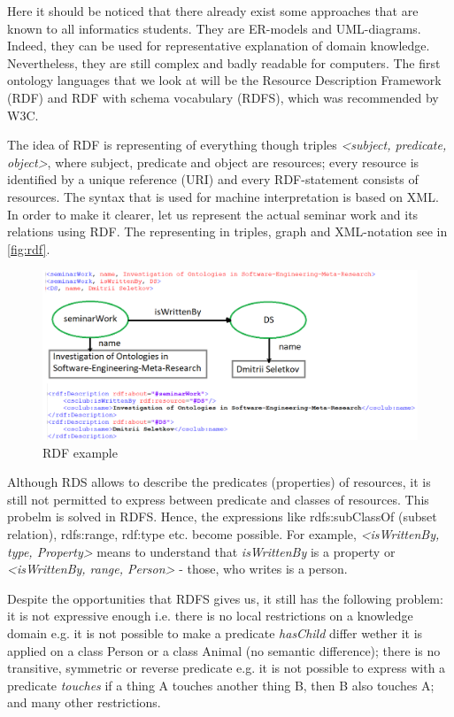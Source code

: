 		Here it should be noticed that there already exist some approaches that are known to all informatics students. They are ER-models and UML-diagrams. Indeed, they can be used for representative explanation of domain knowledge. Nevertheless, they are still complex and badly readable for computers. The first ontology languages that we look at will be the Resource Description Framework (RDF) and RDF with schema vocabulary (RDFS), which was recommended by W3C\cite{w3c01}.
		
		The idea of RDF is representing of everything though triples \textit{<subject, predicate, object>}, where subject, predicate and object are resources; every resource is identified by a unique reference (URI) and every RDF-statement consists of resources. The syntax that is used for machine interpretation is based on XML. In order to make it clearer, let us represent the actual seminar work and its relations using RDF. The representing in triples, graph and XML-notation see in \autoref{fig:rdf}.
		
		\begin{figure}
			\centering
			\includegraphics[width=16cm]{images/rdf.png}
			\caption{RDF example}
			\label{fig:rdf}
		\end{figure}  
		
		Although RDS allows to describe the predicates (properties) of resources, it is still not permitted to express between predicate and classes of resources. This probelm is solved in RDFS. Hence, the expressions like rdfs:subClassOf (subset relation), rdfs:range, rdf:type etc. become possible. For example, \textit{<isWrittenBy, type, Property>} means to understand that \textit{isWrittenBy} is a property or \textit{<isWrittenBy, range, Person>} - those, who writes is a person.
		
		Despite the opportunities that RDFS gives us, it still has the following problem: it is not expressive enough i.e. there is no local restrictions on a knowledge domain e.g. it is not possible to make a predicate \textit{hasChild} differ wether it is applied on a class Person or a class Animal (no semantic difference); there is no transitive, symmetric or reverse predicate e.g. it is not possible to express with a predicate \textit{touches} if a thing A touches another thing B, then B also touches A; and many other restrictions.
		
